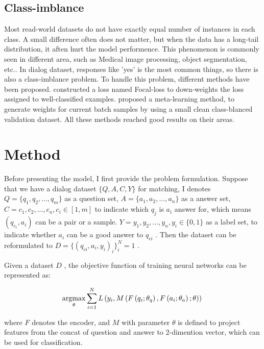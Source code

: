 \documentclass[10pt,twocolumn,letterpaper]{article}
\begin{document}
%
\subsection{Class{-}imblance}%

%
Most read{-}world datasets do not have exactly equal number of instances in each class. A small difference often does not matter, but when the data has a long{-}tail distribution, it aften hurt the model performence. This phenomenon is commonly seen in different area, such as Medical image processing, object segmentation, etc.. In dialog dataset, responses like 'yes' is the most common things, so there is also a class{-}imblance problem. To handle this problem, different methods have been proposed. \cite{Focal} constructed a loss named Focal{-}loss to down{-}weights the loss assigned to well{-}classified examples. \cite{Learning} proposed a meta{-}learning method, to generate weights for current batch samples by using a small clean class{-}blanced validation dataset. All these methods reached good results on their areas.%

%

%
\section{Method}%

%
Before presenting the model, I first provide the problem formulation. Suppose that we have a dialog dataset  $\{Q,A,C,Y\}$  for matching, I denotes  $Q=\{q_1,q_2,...,q_m\}$  as a question set,  $A=\{a_1,a_2,...,a_n\}$  as a answer set,  $C={c_1,c_2,...,c_n},c_i\in [1,m]$  to indicate which  $q_j$  is  $a_i$  answer for, which means  $\left( q_{c_i},a_i\right)$  can be a pair or a sample.  $Y={y_1,y_2,...,y_n},y_i\in\{0,1\}$  as a label set, to indicate whether  $a_i$  can be a good answer to  $q_{ci}$ . Then the dataset can be reformulated to  $D = \{\left(q_{ci},a_i,y_i\right)_i\}^N_i=1$ .%

%
Given a dataset  $D$ , the objective function of training neural networks can be represented as:%

%
\[%
\underset{\theta}{\operatorname{argmax}}  \sum_{i=1}^N L\left(y_i,M\left(F\left(q_i;\theta_q\right),F\left(a_i;\theta_a\right);\theta\right)\right)\\%
\]%
%

%
where  $F$  denotes the encoder, and  $M$  with parameter  $\theta$  is defined to project features from the concat of question and answer to 2{-}dimention vector, which can be used for classification.%
\end{document}
